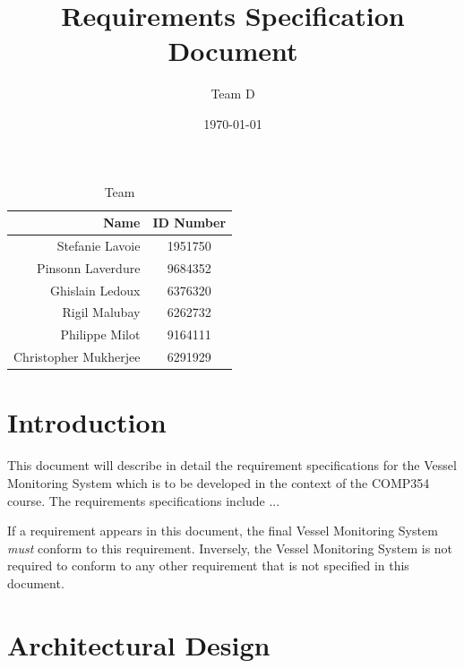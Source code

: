 \documentclass{article}
\begin{document}
\title{Requirements Specification Document}
\author{Team D}
\date{\today}

\maketitle

\vspace*{1.5in}
\begin{table}[htbp]
\caption{Team}
\begin{center}
\begin{tabular}{|r | c|}
\hline
Name & ID Number \\
\hline\hline
Stefanie Lavoie & 1951750 \\
Pinsonn Laverdure & 9684352 \\
Ghislain Ledoux & 6376320 \\
Rigil Malubay & 6262732 \\
Philippe Milot & 9164111 \\
Christopher Mukherjee & 6291929 \\
\hline
\end{tabular}
\end{center}
\end{table}

\clearpage

\tableofcontents
\clearpage


\section{Introduction} %

This document will describe in detail the requirement specifications for the Vessel Monitoring System which is to be developed in the context of the COMP354 course. The requirements specifications include ... 

If a requirement appears in this document, the final Vessel Monitoring System \emph{must} conform to this requirement. Inversely, the Vessel Monitoring System is not required to conform to any other requirement that is not specified in this document.

\section{Architectural Design} %
\end{document}
